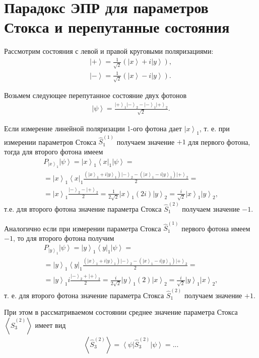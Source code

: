 \section{Парадокс ЭПР для параметров
  Стокса и перепутанные состояния}

Рассмотрим состояния с левой и правой круговыми поляризациями:
\begin{eqnarray}
  \left| + \right> = \frac{1}{\sqrt{2}}
  \left(
  \left|x\right> + i \left|y\right>
  \right),
  \nonumber \\
  \left| - \right> = \frac{1}{\sqrt{2}}
  \left(
  \left|x\right> - i \left|y\right>
  \right).
  \nonumber
\end{eqnarray}

Возьмем следующее перепутанное состояние двух фотонов
\begin{eqnarray}
  \left|\psi\right> = \frac{
    \left| + \right>_1\left| - \right>_2 -
    \left| - \right>_1\left| + \right>_2
  }{\sqrt{2}}.
  \nonumber
\end{eqnarray}

Если измерение линейной поляризации 1-ого фотона дает
$\left|x\right>_1$, т. е. при измерении параметров Стокса
$\hat{S}_1^{(1)}$ получаем значение $+1$ для первого фотона, тогда для
второго фотона имеем
\begin{eqnarray}
  P_{\left|x\right>_1}\left|\psi\right> =
  \left|x\right>_1\left<x\right|_1 \left|\psi\right> =
  \nonumber \\
  =
  \left|x\right>_1\left<x\right|_1
  \frac{
    \left( \left|x\right>_1 + i \left|y\right>_1 \right)\left| - \right>_2 -
    \left( \left|x\right>_1 - i \left|y\right>_1 \right)\left| + \right>_2
  }{2} =
  \nonumber \\
  =
  \left|x\right>_1
  \frac{\left| - \right>_2 - \left| + \right>_2}{2} =
  \frac{1}{2\sqrt{2}}\left|x\right>_1 \left(2 i\right)
  \left|y\right>_2 =
  \frac{i}{\sqrt{2}}\left|x\right>_1\left|y\right>_2,
  \nonumber
\end{eqnarray}
т.е. для второго фотона значение параметра Стокса 
$\hat{S}_1^{(2)}$ получаем значение $-1$.

Аналогично если при измерении параметра Стокса $\hat{S}_1^{(1)}$
первого фотона имеем $-1$, то для второго фотона получим
\begin{eqnarray}
  P_{\left|y\right>_1}\left|\psi\right> =
  \left|y\right>_1\left<y\right|_1 \left|\psi\right> =
  \nonumber \\
  =
  \left|y\right>_1\left<y\right|_1
  \frac{
    \left( \left|x\right>_1 + i \left|y\right>_1 \right)\left| - \right>_2 -
    \left( \left|x\right>_1 - i \left|y\right>_1 \right)\left| + \right>_2
  }{2} =
  \nonumber \\
  =
  \left|y\right>_1 i 
  \frac{\left| - \right>_2 + \left| + \right>_2}{2} =
  \frac{i}{2\sqrt{2}}\left|y\right>_1 \left(2\right)
  \left|x\right>_2 =
  \frac{i}{\sqrt{2}}\left|y\right>_1\left|x\right>_2,
  \nonumber
\end{eqnarray}
т. е. для второго фотона значение параметра Стокса 
$\hat{S}_1^{(2)}$ получаем значение $+1$.

При этом в рассматриваемом состоянии среднее значение параметра Стокса
$\left<\hat{S}_3^{(2)}\right>$ имеет вид
\begin{eqnarray}
  \left<\hat{S}_3^{(2)}\right> =
  \left<\psi\right|\hat{S}_3^{(2)}\left|\psi\right> =
  ...
  \nonumber
\end{eqnarray}
